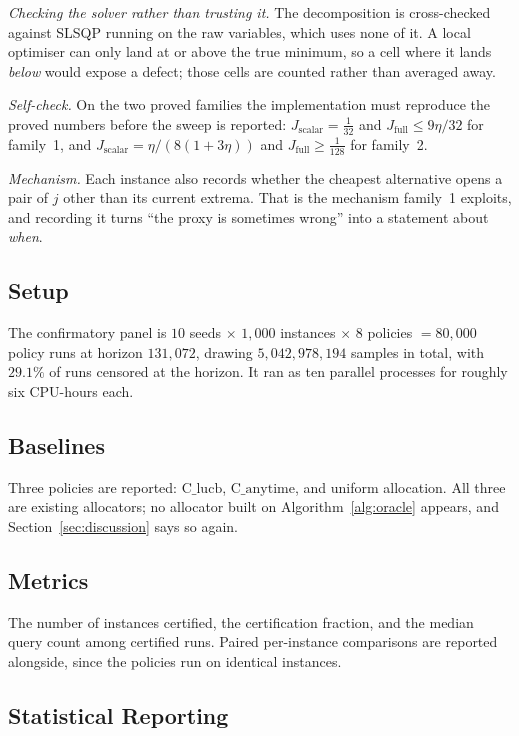 \documentclass[conference]{IEEEtran}
\theoremstyle{definition}
\begin{document}
\emph{Checking the solver rather than trusting it.} The decomposition is cross-checked
against SLSQP running on the raw variables, which uses none of it. A local optimiser can only
land at or above the true minimum, so a cell where it lands \emph{below} would expose a
defect; those cells are counted rather than averaged away.

\emph{Self-check.} On the two proved families the implementation must reproduce the proved
numbers before the sweep is reported: $J_{\mathrm{scalar}}=\tfrac1{32}$ and
$J_{\mathrm{full}}\le 9\eta/32$ for family~1, and
$J_{\mathrm{scalar}}=\eta/(8(1+3\eta))$ and $J_{\mathrm{full}}\ge\tfrac1{128}$ for family~2.

\emph{Mechanism.} Each instance also records whether the cheapest alternative opens a pair of
$j$ other than its current extrema. That is the mechanism family~1 exploits, and recording it
turns ``the proxy is sometimes wrong'' into a statement about \emph{when}.

\subsection{Setup}

The confirmatory panel is $10$ seeds $\times$ $1{,}000$ instances $\times$ $8$ policies
$=80{,}000$ policy runs at horizon $131{,}072$, drawing $5{,}042{,}978{,}194$ samples in
total, with $29.1\%$ of runs censored at the horizon. It ran as ten parallel processes for
roughly six CPU-hours each.

\subsection{Baselines}

Three policies are reported: $\mathrm{C\_lucb}$, $\mathrm{C\_anytime}$, and uniform
allocation. All three are existing allocators; no allocator built on
Algorithm~\ref{alg:oracle} appears, and Section~\ref{sec:discussion} says so again.

\subsection{Metrics}

The number of instances certified, the certification fraction, and the median query count
among certified runs. Paired per-instance comparisons are reported alongside, since the
policies run on identical instances.

\subsection{Statistical Reporting}
\end{document}
